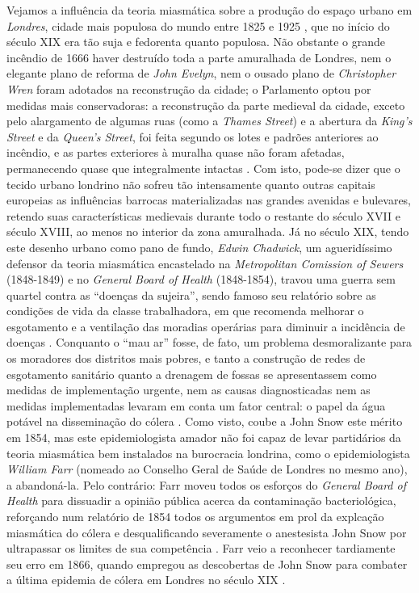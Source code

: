Vejamos a influência da teoria miasmática sobre a produção do espaço urbano em \textit{Londres}, cidade mais populosa do mundo entre 1825 e 1925 \cite{morris_socdev_2010}, que no início do século XIX era tão suja e fedorenta quanto populosa. Não obstante o grande incêndio de 1666 haver destruído toda a parte amuralhada de Londres, nem o elegante plano de reforma de \textit{John Evelyn}, nem o ousado plano de \textit{Christopher Wren} foram adotados na reconstrução da cidade; o Parlamento optou por medidas mais conservadoras: a reconstrução da parte medieval da cidade, exceto pelo alargamento de algumas ruas (como a \textit{Thames Street}) e a abertura da \textit{King's Street} e da \textit{Queen's Street}, foi feita segundo os lotes e padrões anteriores ao incêndio, e as partes exteriores à muralha quase não foram afetadas, permanecendo quase que integralmente intactas \cite{peets_reblondon_1930,hanson_londonfire_1989}. Com isto, pode-se dizer que o tecido urbano londrino não sofreu tão intensamente quanto outras capitais europeias as influências barrocas materializadas nas grandes avenidas e bulevares, retendo suas características medievais durante todo o restante do século XVII e século XVIII, ao menos no interior da zona amuralhada. Já no século XIX, tendo este desenho urbano como pano de fundo, \textit{Edwin Chadwick}, um agueridíssimo defensor da teoria miasmática encastelado na \textit{Metropolitan Comission of Sewers} (1848-1849) e no \textit{General Board of Health} (1848-1854), travou uma guerra sem quartel contra as ``doenças da sujeira'', sendo famoso seu relatório sobre as condições de vida da classe trabalhadora, em que recomenda melhorar o esgotamento e a ventilação das moradias operárias para diminuir a incidência de doenças \cite{chadwick_report_1842}. Conquanto o ``mau ar'' fosse, de fato, um problema desmoralizante para os moradores dos distritos mais pobres, e tanto a construção de redes de esgotamento sanitário quanto a drenagem de fossas se apresentassem como medidas de implementação urgente, nem as causas diagnosticadas nem as medidas implementadas levaram em conta um fator central: o papel da água potável na disseminação do cólera \cite[p.~84]{platt_landuse_2014}. Como visto, coube a John Snow este mérito em 1854, mas este epidemiologista amador não foi capaz de levar partidários da teoria miasmática bem instalados na burocracia londrina, como o epidemiologista \textit{William Farr} (nomeado ao Conselho Geral de Saúde de Londres no mesmo ano), a abandoná-la. Pelo contrário: Farr moveu todos os esforços do \textit{General Board of Health} para dissuadir a opinião pública acerca da contaminação bacteriológica, reforçando num relatório de 1854 todos os argumentos em prol da explcação miasmática do cólera e desqualificando severamente o anestesista John Snow por ultrapassar os limites de sua competência \cite{farr_report_1854}. Farr veio a reconhecer tardiamente seu erro em 1866, quando empregou as descobertas de John Snow para combater a última epidemia de cólera em Londres no século XIX \cite[p.~1.471]{halliday_miaslond_2001}. 

